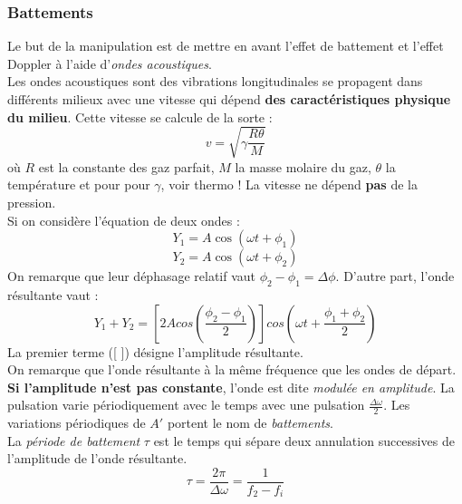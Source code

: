 \documentclass	[11pt, a4paper, openany]{book}
\begin{document}
		\subsubsection*{Battements}
		Le but de la manipulation est de mettre en avant l'effet de battement et l'effet Doppler à l'aide d'\textit{ondes acoustiques}.\\
		Les ondes acoustiques sont des vibrations longitudinales se propagent dans différents milieux avec une vitesse qui dépend \textbf{des caractéristiques physique du milieu}. Cette vitesse se calcule de la sorte : 
		\begin{equation}
			v = \sqrt{\gamma\frac{R\theta}{M}}
			\label{vitesse}
		\end{equation}
		où $R$ est la constante des gaz parfait, $M$ la masse molaire du gaz, $\theta$ la température et pour pour $\gamma$, voir thermo ! La vitesse ne dépend \textbf{pas} de la pression.\\
		
		Si on considère l'équation de deux ondes :
		\begin{equation}
			Y_1 = A\cos(\omega t + \phi_1)
			\label{y1}
		\end{equation}
		\begin{equation}
			Y_2 = A\cos(\omega t + \phi_2)
			\label{y2}
		\end{equation}
		On remarque que leur déphasage relatif vaut $\phi_2 - \phi_1 = \Delta \phi$. D'autre part, l'onde résultante vaut :
		\begin{equation}
			Y_1 + Y_2 = \left[2Acos\left(\frac{\phi_2 - \phi_1}{2}\right)\right]cos\left(\omega t + \frac{\phi_1 + \phi_2}{2}\right)
			\label{y1+y2}
		\end{equation}
		La premier terme ([ ]) désigne l'amplitude résultante. \\
		On remarque que l'onde résultante à la même fréquence que les ondes de départ.\\
		
		\textbf{Si l'amplitude n'est pas constante}, l'onde est dite \textit{modulée en amplitude}. La pulsation varie périodiquement avec le temps avec une pulsation $\frac{\Delta\omega}{2}$. Les variations périodiques de $A'$ portent le nom de \textit{battements}. \\
		La \textit{période de battement} $\tau$ est le temps qui sépare deux annulation successives de l'amplitude de l'onde résultante.
		\begin{equation}
			\tau = \frac{2\pi}{\Delta\omega} = \frac{1}{f_2 - f_i}
			\label{tau}
		\end{equation}
		
\end{document}
